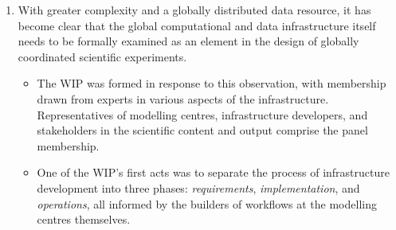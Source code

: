 \documentclass[gmd,manuscript]{copernicus}
\begin{document}
\begin{enumerate}
\item With greater complexity and a globally distributed data
  resource, it has become clear that the global computational and data
  infrastructure itself needs to be formally examined as an element in
  the design of globally coordinated scientific experiments.

  \begin{itemize}
  \item The WIP was formed in response to this observation, with
    membership drawn from experts in various aspects of the
    infrastructure. Representatives of modelling centres,
    infrastructure developers, and stakeholders in the scientific
    content and output comprise the panel membership.
  \item One of the WIP's first acts was to separate the process of
    infrastructure development into three phases: \emph{requirements},
    \emph{implementation}, and \emph{operations}, all informed by the
    builders of workflows at the modelling centres themselves.
    

\end{itemize}
\end{enumerate}
\end{document}
